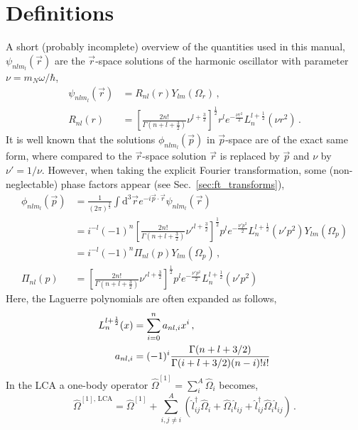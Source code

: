 \documentclass[10pt]{article}
\begin{document}
\section{Definitions}
\label{sec:def}
A short (probably incomplete) overview of the quantities used in this manual,
$\psi_{n l m_{l}} (\vec{r})$ are the $\vec{r}$-space solutions of the harmonic oscillator with parameter $\nu = m_{N} \omega / \hbar $,
\begin{align}
\psi_{n l m_{l}}(\vec{r}) &= R_{n l} (r) Y_{l m}(\Omega_{r}) \, , \\
R_{n l}(r) &= \left[ \frac{ 2n!}{\Gamma(n+l+\frac{3}{2})} \nu^{l+\frac{3}{2}} \right]^{\frac{1}{2}} r^{l} e^{-\frac{\nu r^{2}}{2}} L_{n}^{l+\frac{1}{2}}( \nu r^{2}) \, .
\end{align}
It is well known that the solutions $\phi_{n l m_{l}} (\vec{p})$  in $\vec{p}$-space are of the exact same form, where compared to the $\vec{r}$-space solution $\vec{r}$ is replaced by $\vec{p}$ and $\nu$ by $\nu' = 1/\nu$.
However, when taking the explicit Fourier transformation, some (non-neglectable) phase factors appear (see Sec.~\ref{sec:ft_transforms}),
\begin{align}
	\phi_{n l m_{l}}(\vec{p}) &= \frac{1}{(2\pi)^{ \frac{3}{2}}}  \int \text{d}^{3} \vec{r} e^{- i \vec{p} \cdot \vec{r}} \psi_{n l m_{l}}(\vec{r}) \\
	&= i^{-l} (-1)^{n} \left[ \frac{ 2n!}{\Gamma(n+l+\frac{3}{2})} \nu'^{l+\frac{3}{2}} \right]^{\frac{1}{2}} p^{l} e^{-\frac{\nu' p^{2}}{2}} L_{n}^{l+\frac{1}{2}}(\nu'p^{2})  Y_{l m}(\Omega_p) \\
	&= i^{-l} (-1)^{n} \Pi_{n l}(p)  Y_{l m}(\Omega_p) \, , \\
 \Pi_{n l}(p) &= \left[ \frac{ 2n!}{\Gamma(n+l+\frac{3}{2})} \nu'^{l+\frac{3}{2}} \right]^{\frac{1}{2}} p^{l} e^{-\frac{\nu' p^{2}}{2}} L_{n}^{l+\frac{1}{2}}(\nu'p^{2})
\end{align}
Here, the Laguerre polynomials are often expanded as follows,
\begin{align}
	L_{n}^{l+\frac{1}{2}}(x) &= \sum_{i=0}^{n} a_{nl,i} x^{i} \, , \notag \\
	a_{nl,i} &= (-1)^{i} \frac{ \Gamma(n+l+3/2) }{ \Gamma(i+l+3/2)(n-i)! i!}
	\label{eq:def:laguerre_exp}
\end{align}
In the LCA a one-body operator $\widehat{\Omega}^{[1]} = \sum_{i}^{A} \widehat{\Omega}_{i}$ becomes,
\begin{equation}
	\widehat{\Omega}^{[1],\,\text{LCA}} = \widehat{\Omega}^{[1]} + \sum_{i,j \neq i}^{A} \left( \hat{l}_{ij}^{\dagger} \widehat{\Omega}_{i} +  \widehat{\Omega}_{i} \hat{l}_{ij} + \hat{l}_{ij}^{\dagger}  \widehat{\Omega}_{i} \hat{l}_{ij} \right) \, .
	\label{eq:LCA_one_body}
\end{equation}
\end{document}
